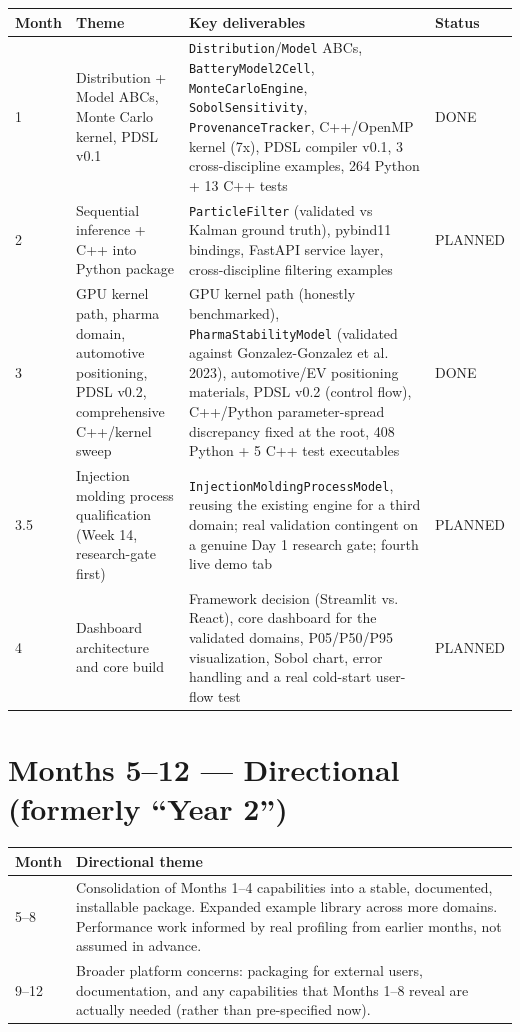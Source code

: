 \documentclass[11pt]{article}
\begin{document}
\begin{longtable}{p{1.3cm}p{4.5cm}p{7.5cm}p{1.6cm}}
\toprule
\textbf{Month} & \textbf{Theme} & \textbf{Key deliverables} & \textbf{Status} \\
\midrule
\endhead
1 & Distribution + Model ABCs, Monte Carlo kernel, PDSL v0.1 &
  \texttt{Distribution}/\texttt{Model} ABCs, \texttt{BatteryModel2Cell},
  \texttt{MonteCarloEngine}, \texttt{SobolSensitivity},
  \texttt{ProvenanceTracker}, C++/OpenMP kernel (7x), PDSL compiler v0.1,
  3 cross-discipline examples, 264 Python + 13 C++ tests &
  DONE \\
2 & Sequential inference + C++ into Python package &
  \texttt{ParticleFilter} (validated vs Kalman ground truth), pybind11
  bindings, FastAPI service layer, cross-discipline filtering examples &
  PLANNED \\
3 & GPU kernel path, pharma domain, automotive positioning, PDSL v0.2,
  comprehensive C++/kernel sweep &
  GPU kernel path (honestly benchmarked), \texttt{PharmaStabilityModel}
  (validated against Gonzalez-Gonzalez et al. 2023), automotive/EV
  positioning materials, PDSL v0.2 (control flow), C++/Python
  parameter-spread discrepancy fixed at the root, 408 Python + 5 C++
  test executables &
  DONE \\
3.5 & Injection molding process qualification (Week 14, research-gate
  first) &
  \texttt{InjectionMoldingProcessModel}, reusing the existing engine
  for a third domain; real validation contingent on a genuine Day 1
  research gate; fourth live demo tab &
  PLANNED \\
4 & Dashboard architecture and core build &
  Framework decision (Streamlit vs. React), core dashboard for the
  validated domains, P05/P50/P95 visualization, Sobol chart, error
  handling and a real cold-start user-flow test &
  PLANNED \\
\bottomrule
\end{longtable}

\section*{Months 5--12 --- Directional (formerly ``Year 2'')}

\begin{longtable}{p{1.3cm}p{11.9cm}}
\toprule
\textbf{Month} & \textbf{Directional theme} \\
\midrule
\endhead
5--8 & Consolidation of Months 1--4 capabilities into a stable,
  documented, installable package. Expanded example library across more
  domains. Performance work informed by real profiling from earlier
  months, not assumed in advance. \\
9--12 & Broader platform concerns: packaging for external users,
  documentation, and any capabilities that Months 1--8 reveal are
  actually needed (rather than pre-specified now). \\
\bottomrule
\end{longtable}
\end{document}
